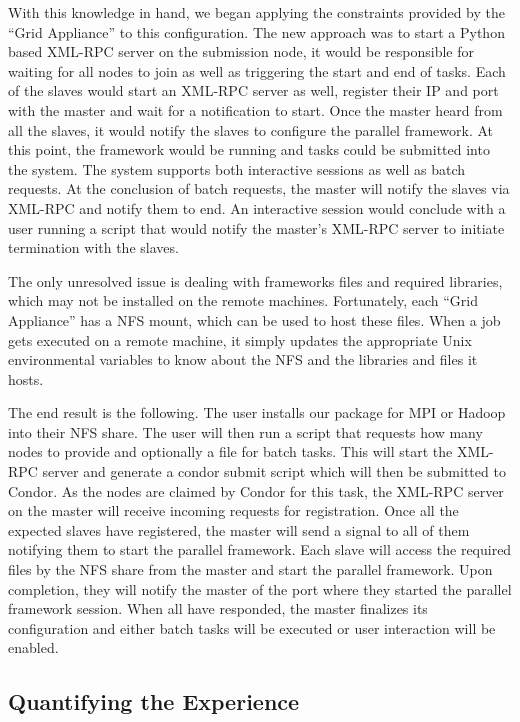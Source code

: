 \documentclass[twocolumn]{svjour3}
\begin{document}
With this knowledge in hand, we began applying the constraints provided by the
``Grid Appliance'' to this configuration.  The new approach was to start a
Python based XML-RPC server on the submission node, it would be responsible for
waiting for all nodes to join as well as triggering the start and end of tasks.
Each of the slaves would start an XML-RPC server as well, register their IP and
port with the master and wait for a notification to start.  Once the master
heard from all the slaves, it would notify the slaves to configure the parallel
framework.  At this point, the framework would be running and tasks could be
submitted into the system.  The system supports both interactive sessions as
well as batch requests.  At the conclusion of batch requests, the master will
notify the slaves via XML-RPC and notify them to end.  An interactive session
would conclude with a user running a script that would notify the master's
XML-RPC server to initiate termination with the slaves.

The only unresolved issue is dealing with frameworks files and required
libraries, which may not be installed on the remote machines.  Fortunately,
each ``Grid Appliance'' has a NFS mount, which can be used to host these files.
When a job gets executed on a remote machine, it simply updates the appropriate
Unix environmental variables to know about the NFS and the libraries and files
it hosts.

The end result is the following.  The user installs our package for MPI or
Hadoop into their NFS share.  The user will then run a script that requests how
many nodes to provide and optionally a file for batch tasks.  This will start
the XML-RPC server and generate a condor submit script which will then be
submitted to Condor.  As the nodes are claimed by Condor for this task, the
XML-RPC server on the master will receive incoming requests for registration.
Once all the expected slaves have registered, the master will send a signal to
all of them notifying them to start the parallel framework.  Each slave will
access the required files by the NFS share from the master and start the
parallel framework.  Upon completion, they will notify the master of the port
where they started the parallel framework session.  When all have responded,
the master finalizes its configuration and either batch tasks will be executed
or user interaction will be enabled.

\subsection{Quantifying the Experience}
\end{document}
